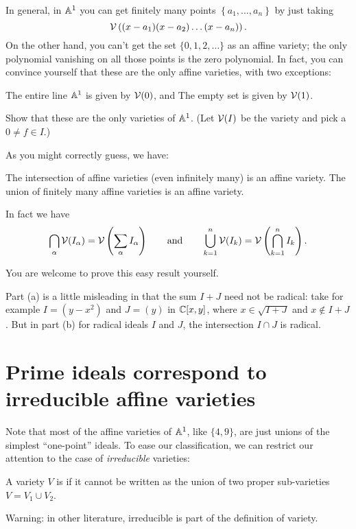 In general, in $\mathbb A^1$ you can get finitely
many points $\left\{ a_1, \dots, a_n \right\}$ by
just taking \[ \mathcal V\left( (x-a_1)(x-a_2)\dots(x-a_n) \right). \]
On the other hand, you can't get the set $\{0,1,2,\dots\}$ as an affine variety;
the only polynomial vanishing
on all those points is the zero polynomial.
In fact, you can convince yourself that these
are the only affine varieties, with two exceptions:
\begin{itemize}
	\ii The entire line $\mathbb A^1$ is given by $\mathcal V(0)$, and
	\ii The empty set is given by $\mathcal V(1)$.
\end{itemize}
\begin{exercise}
	Show that these are the only varieties of $\mathbb A^1$.
	(Let $\mathcal V(I)$ be the variety and pick a $0 \neq f \in I$.)
\end{exercise}

As you might correctly guess, we have:
\begin{theorem}
	\label{thm:many_aff_variety}
	\listhack
	\begin{enumerate}[(a)]
		\ii The intersection of affine varieties
		(even infinitely many) is an affine variety.
		\ii The union of finitely many affine varieties
		is an affine variety.
	\end{enumerate}
	In fact we have
	\[ \bigcap_\alpha \mathcal V(I_\alpha)
		= \mathcal V\left( \sum_\alpha I_\alpha \right)
		\qquad\text{and}\qquad
		\bigcup_{k=1}^n \mathcal V(I_k)
		= \mathcal V\left( \bigcap_{k=1}^n I_k \right). \]
\end{theorem}
You are welcome to prove this easy result yourself.
\begin{remark}
	Part (a) is a little misleading in that the sum $I+J$ need not be radical:
	take for example $I = (y-x^2)$ and $J = (y)$ in $\mathbb C[x,y]$,
	where $x \in \sqrt{I+J}$ and $x \notin I+J$.
	But in part (b) for radical ideals $I$ and $J$,
	the intersection $I \cap J$ is radical.
\end{remark}

\section{Prime ideals correspond to irreducible affine varieties}

Note that most of the affine varieties of $\mathbb A^1$, like $\{4,9\}$,
are just unions of the simplest ``one-point'' ideals.
To ease our classification,
we can restrict our attention to the case of \emph{irreducible} varieties:
\begin{definition}
	A variety $V$ is  if it cannot be written
	as the union of two proper sub-varieties $V = V_1 \cup V_2$.
\end{definition}
\begin{abuse}
	Warning: in other literature,
	irreducible is part of the definition of variety.
\end{abuse}

